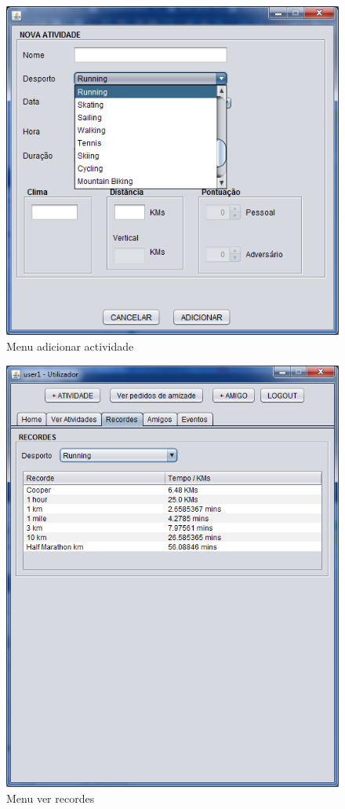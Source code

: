 \documentclass[12pt,notitlepage]{article}
\begin{document}
\begin{figure}[h]
\centering
\includegraphics[scale=1]{addActividade.png}
\caption{Menu adicionar actividade}
\end{figure}


\begin{figure}[h]
\centering
\includegraphics[scale=1]{verRecord.png}
\caption{Menu ver recordes}
\end{figure}
\end{document}
